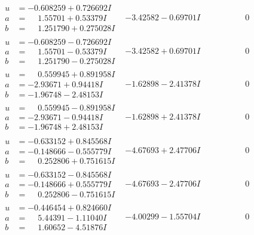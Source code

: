 \documentclass[1p]{elsarticle_modified}
\theoremstyle{definition}
\begin{document}
$$\begin{array}{c|c|c}
\begin{aligned}
u &= -0.608259 + 0.726692 I \\
a &= \phantom{-}1.55701 + 0.53379 I \\
b &= \phantom{-}1.251790 + 0.275028 I\end{aligned}
 & -3.42582 - 0.69701 I & \phantom{-0.000000 } 0 \\ \hline\begin{aligned}
u &= -0.608259 - 0.726692 I \\
a &= \phantom{-}1.55701 - 0.53379 I \\
b &= \phantom{-}1.251790 - 0.275028 I\end{aligned}
 & -3.42582 + 0.69701 I & \phantom{-0.000000 } 0 \\ \hline\begin{aligned}
u &= \phantom{-}0.559945 + 0.891958 I \\
a &= -2.93671 + 0.94418 I \\
b &= -1.96748 - 2.48153 I\end{aligned}
 & -1.62898 - 2.41378 I & \phantom{-0.000000 } 0 \\ \hline\begin{aligned}
u &= \phantom{-}0.559945 - 0.891958 I \\
a &= -2.93671 - 0.94418 I \\
b &= -1.96748 + 2.48153 I\end{aligned}
 & -1.62898 + 2.41378 I & \phantom{-0.000000 } 0 \\ \hline\begin{aligned}
u &= -0.633152 + 0.845568 I \\
a &= -0.148666 - 0.555779 I \\
b &= \phantom{-}0.252806 + 0.751615 I\end{aligned}
 & -4.67693 + 2.47706 I & \phantom{-0.000000 } 0 \\ \hline\begin{aligned}
u &= -0.633152 - 0.845568 I \\
a &= -0.148666 + 0.555779 I \\
b &= \phantom{-}0.252806 - 0.751615 I\end{aligned}
 & -4.67693 - 2.47706 I & \phantom{-0.000000 } 0 \\ \hline\begin{aligned}
u &= -0.446454 + 0.824660 I \\
a &= \phantom{-}5.44391 - 1.11040 I \\
b &= \phantom{-}1.60652 - 4.51876 I\end{aligned}
 & -4.00299 - 1.55704 I & \phantom{-0.000000 } 0 \\ \hline\begin{aligned}

\end{aligned}
\end{array}$$
\end{document}
